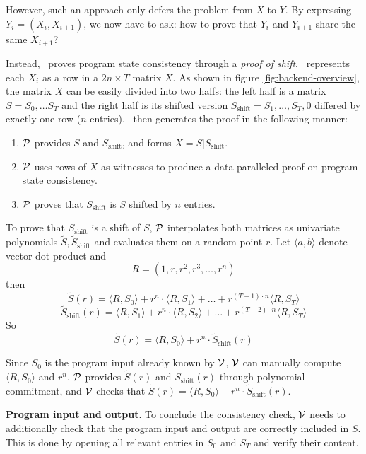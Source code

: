 However, such an approach only defers the problem from $X$ to $Y$. By expressing $Y_i = (X_i, X_{i+1})$, we now have to ask: how to prove that $Y_i$ and $Y_{i+1}$ share the same $X_{i+1}$?

Instead, \CoBBl~proves program state consistency through a \emph{proof of shift}. \CoBBl~represents each $X_i$ as a row in a $2n \times T$ matrix $X$. As shown in figure \ref{fig:backend-overview}, the matrix $X$ can be easily divided into two halfs: the left half is a matrix $S = S_0, \dots S_T$ and the right half is its shifted version $S_{\text{shift}} = S_1, \dots, S_T, 0$ differed by exactly one row ($n$ entries). \CoBBl~then generates the proof in the following manner:
\begin{enumerate}
    \item $\P$ provides $S$ and $S_{\text{shift}}$, and forms $X = S | S_{\text{shift}}$.
    \item $\P$ uses rows of $X$ as witnesses to produce a data-paralleled proof on program state consistency.
    \item $\P$ proves that $S_{\text{shift}}$ is $S$ shifted by $n$ entries.
\end{enumerate}

To prove that $S_{\text{shift}}$ is a shift of $S$, $\P$ interpolates both matrices as univariate polynomials $\tilde{S}, \tilde{S}_{\text{shift}}$ and evaluates them on a random point $r$. Let $\langle a, b \rangle$ denote vector dot product and
$$R = (1, r, r^2, r^3, \dots, r^n)$$
then
$$\tilde{S}(r) = \langle R, S_0 \rangle + r^n\cdot \langle R, S_1 \rangle + \dots + r^{(T-1)\cdot n} \langle R, S_T \rangle$$
$$\tilde{S}_{\text{shift}}(r) = \langle R, S_1 \rangle + r^n\cdot \langle R, S_2 \rangle + \dots + r^{(T-2)\cdot n} \langle R, S_T \rangle$$
So
$$\tilde{S}(r) = \langle R, S_0 \rangle + r^n \cdot \tilde{S}_{\text{shift}}(r)$$

Since $S_0$ is the program input already known by $\V$, $\V$ can manually compute $\langle R, S_0 \rangle$ and $r^n$. $\P$ provides $\tilde{S}(r)$ and $\tilde{S}_{\text{shift}}(r)$ through polynomial commitment, and $\V$ checks that $\tilde{S}(r) = \langle R, S_0 \rangle + r^n \cdot \tilde{S}_{\text{shift}}(r)$.

\bigskip
\noindent\textbf{Program input and output}. To conclude the consistency check, $\V$ needs to additionally check that the program input and output are correctly included in $S$. This is done by opening all relevant entries in $S_0$ and $S_T$ and verify their content.

